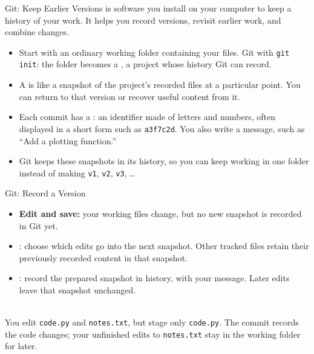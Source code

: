 \begin{frame}{Git: Keep Earlier Versions}
 is software you install on your computer to keep a history of your work. It helps you record versions, revisit earlier work, and combine changes.
\par\medskip
\begin{itemize}
\item Start with an ordinary working folder containing your files.  Git with \texttt{git init}: the folder becomes a , a project whose history Git can record.
\item A  is like a snapshot of the project's recorded files at a particular point. You can return to that version or recover useful content from it.
\item Each commit has a : an identifier made of letters and numbers, often displayed in a short form such as \texttt{a3f7c2d}. You also write a message, such as ``Add a plotting function.''
\item Git keeps these snapshots in its history, so you can keep working in one folder instead of making \texttt{v1}, \texttt{v2}, \texttt{v3}, \ldots
\end{itemize}
\end{frame}

\begin{frame}{Git: Record a Version}
\par\smallskip
\begingroup\centering
{}
\par\endgroup\smallskip
\begin{itemize}
\item \textbf{Edit and save:} your working files change, but no new snapshot is recorded in Git yet.
\item {}: choose which edits go into the next snapshot. Other tracked files retain their previously recorded content in that snapshot.
\item {}: record the prepared snapshot in history, with your message. Later edits leave that snapshot unchanged.
\end{itemize}
\medskip
{}\\
You edit \texttt{code.py} and \texttt{notes.txt}, but stage only \texttt{code.py}. The commit records the code changes; your unfinished edits to \texttt{notes.txt} stay in the working folder for later.
\end{frame}

